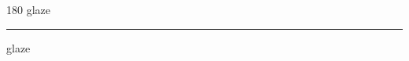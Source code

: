 
\begin{frame}
\begin{center}
\begin{turn}{180}
{\fontsize{2.5cm}{1em}\selectfont glaze}
\end{turn}
\vspace{1em}\par  
\hrule
\vspace{1em}\par  
{\fontsize{2.5cm}{1em}\selectfont glaze}
\end{center}
\end{frame}
